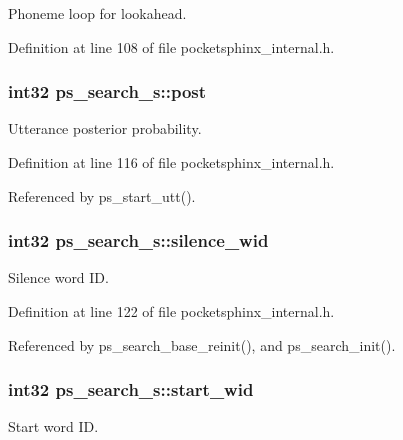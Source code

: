 Phoneme loop for lookahead. 



Definition at line 108 of file pocketsphinx\-\_\-internal.\-h.

\subsubsection[{post}]{\setlength{\rightskip}{0pt plus 5cm}int32 ps\-\_\-search\-\_\-s\-::post}\label{structps__search__s_a721a656d0e34f7604ea8c52a1bdf14ff}


Utterance posterior probability. 



Definition at line 116 of file pocketsphinx\-\_\-internal.\-h.



Referenced by ps\-\_\-start\-\_\-utt().

\subsubsection[{silence\-\_\-wid}]{\setlength{\rightskip}{0pt plus 5cm}int32 ps\-\_\-search\-\_\-s\-::silence\-\_\-wid}\label{structps__search__s_ab6851b4675f38ab6b3683d75521f000b}


Silence word I\-D. 



Definition at line 122 of file pocketsphinx\-\_\-internal.\-h.



Referenced by ps\-\_\-search\-\_\-base\-\_\-reinit(), and ps\-\_\-search\-\_\-init().

\subsubsection[{start\-\_\-wid}]{\setlength{\rightskip}{0pt plus 5cm}int32 ps\-\_\-search\-\_\-s\-::start\-\_\-wid}\label{structps__search__s_ae1a9fa33bfc851ec91ce96870714b3cc}


Start word I\-D. 



